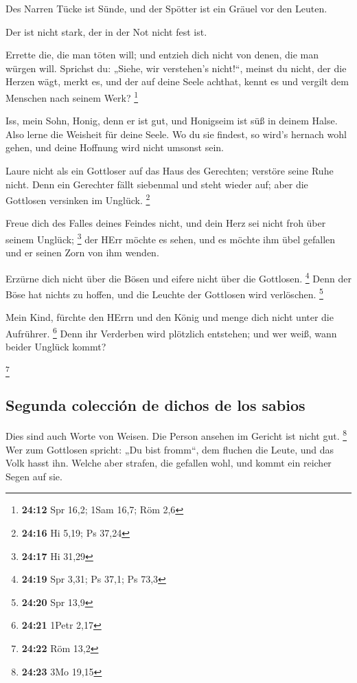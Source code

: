  Des Narren Tücke ist Sünde, und der Spötter ist ein
Gräuel vor den Leuten.

 Der ist nicht stark, der in der Not nicht fest ist.

 Errette die, die man töten will; und entzieh dich nicht
von denen, die man würgen will.  Sprichst du: „Siehe, wir
verstehen's nicht!{}``, meinst du nicht, der die Herzen wägt, merkt es,
und der auf deine Seele achthat, kennt es und vergilt dem Menschen nach
seinem Werk? \footnote{\textbf{24:12} Spr 16,2; 1Sam 16,7; Röm 2,6}

 Iss, mein Sohn, Honig, denn er ist gut, und Honigseim
ist süß in deinem Halse.  Also lerne die Weisheit für
deine Seele. Wo du sie findest, so wird's hernach wohl gehen, und deine
Hoffnung wird nicht umsonst sein.

 Laure nicht als ein Gottloser auf das Haus des
Gerechten; verstöre seine Ruhe nicht.  Denn ein Gerechter
fällt siebenmal und steht wieder auf; aber die Gottlosen versinken im
Unglück. \footnote{\textbf{24:16} Hi 5,19; Ps 37,24}

 Freue dich des Falles deines Feindes nicht, und dein
Herz sei nicht froh über seinem Unglück; \footnote{\textbf{24:17} Hi
  31,29}  der HErr möchte es sehen, und es möchte ihm
übel gefallen und er seinen Zorn von ihm wenden.

 Erzürne dich nicht über die Bösen und eifere nicht über
die Gottlosen. \footnote{\textbf{24:19} Spr 3,31; Ps 37,1; Ps 73,3}
 Denn der Böse hat nichts zu hoffen, und die Leuchte der
Gottlosen wird verlöschen. \footnote{\textbf{24:20} Spr 13,9}

 Mein Kind, fürchte den HErrn und den König und menge
dich nicht unter die Aufrührer. \footnote{\textbf{24:21} 1Petr 2,17}
 Denn ihr Verderben wird plötzlich entstehen; und wer
weiß, wann beider Unglück kommt?

\footnote{\textbf{24:22} Röm 13,2}

\hypertarget{segunda-colecciuxf3n-de-dichos-de-los-sabios}{%
\subsection{Segunda colección de dichos de los
sabios}\label{segunda-colecciuxf3n-de-dichos-de-los-sabios}}

 Dies sind auch Worte von Weisen. Die Person ansehen im
Gericht ist nicht gut. \footnote{\textbf{24:23} 3Mo 19,15}
 Wer zum Gottlosen spricht: „Du bist fromm``, dem fluchen
die Leute, und das Volk hasst ihn.  Welche aber strafen,
die gefallen wohl, und kommt ein reicher Segen auf sie.


